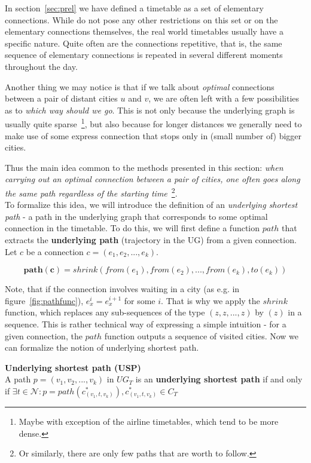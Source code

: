 In section~\ref{sec:prel} we have defined a timetable as a set of elementary connections. While do not pose any other restrictions on this set or on the elementary connections themselves, the real world timetables usually have a specific nature. Quite often are the connections repetitive, that is, the same sequence of elementary connections is repeated in several different moments throughout the day.

Another thing we may notice is that if we talk about \textit{optimal} connections between a pair of distant cities $u$ and $v$, we are often left with a few possibilities as to \textit{which way should we go}. This is not only because the underlying graph is usually quite sparse~\footnote{Maybe with exception of the airline timetables, which tend to be more dense.}, but also because for longer distances we generally need to make use of some express connection that stops only in (small number of) bigger cities.

Thus the main idea common to the methods presented in this section: \textit{when carrying out an optimal connection between a pair of cities, one often goes along the same path regardless of the starting time}~\footnote{Or similarly, there are only few paths that are worth to follow.}. \\

\noindent To formalize this idea, we will introduce the definition of an \textit{underlying shortest path} - a path in the underlying graph that corresponds to some optimal connection in the timetable. To do this, we will first define a function $path$ that extracts the \textbf{underlying path} (trajectory in the UG) from a given connection. Let $c$ be a connection $c = (e_{1}, e_{2}, ..., e_{k})$.

\begin{equation*}
	\bm{path(c)} = shrink(from(e_{1}), from(e_{2}), ..., from(e_{k}), to(e_{k}))
\end{equation*}

\noindent Note, that if the connection involves waiting in a city (as e.g. in figure~\ref{fig:pathfunc}), $e_{x}^{i} = e_{x}^{i + 1}$ for some $i$. That is why we apply the $shrink$ function, which replaces any sub-sequences of the type $(z, z, ..., z)$ by $(z)$ in a sequence. This is rather technical way of expressing a simple intuition - for a given connection, the $path$ function outputs a sequence of visited cities. Now we can formalize the notion of underlying shortest path.

\begin{definition}
    \textbf{Underlying shortest path (USP)} \\
	A path $p = (v_{1}, v_{2}, ..., v_{k})$ in $UG_{T}$ is an \textbf{underlying shortest path} if and only if $\exists t \in \mathcal{N}: p = path(c_{(v_{1}, t, v_{k})}^{*}), c_{(v_{1}, t, v_{k})}^{*} \in C_{T}$
\end{definition}
    
